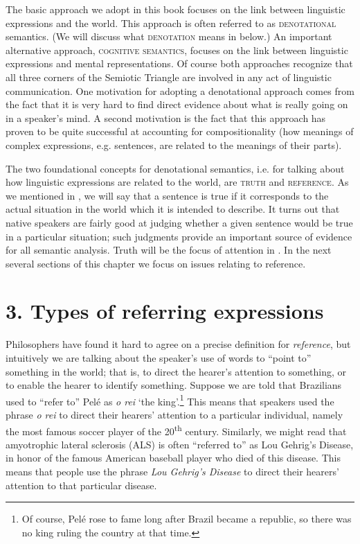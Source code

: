 The basic approach we adopt in this book focuses on the link between linguistic expressions and the world. This approach is often referred to as \textsc{denotational} semantics. (We will discuss what \textsc{denotation} means in  below.) An important alternative approach, \textsc{cognitive semantics}, focuses on the link between linguistic expressions and mental representations. Of course both approaches recognize that all three corners of the Semiotic Triangle are involved in any act of linguistic communication. One motivation for adopting a denotational approach comes from the fact that it is very hard to find direct evidence about what is really going on in a speaker’s mind. A second motivation is the fact that this approach has proven to be quite successful at accounting for compositionality (how meanings of complex expressions, e.g. sentences, are related to the meanings of their parts).



The two foundational concepts for denotational semantics, i.e. for talking about how linguistic expressions are related to the world, are \textsc{truth} and \textsc{reference}. As we mentioned in , we will say that a sentence is true if it corresponds to the actual situation in the world which it is intended to describe. It turns out that native speakers are fairly good at judging whether a given sentence would be true in a particular situation; such judgments provide an important source of evidence for all semantic analysis. Truth will be the focus of attention in . In the next several sections of this chapter we focus on issues relating to reference.


\section{3. Types of referring expressions}\label{sec:}

Philosophers have found it hard to agree on a precise definition for \textit{reference}, but intuitively we are talking about the speaker’s use of words to “point to” something in the world; that is, to direct the hearer’s attention to something, or to enable the hearer to identify something. Suppose we are told that Brazilians used to “refer to” Pelé as \textit{o rei} ‘the king’.\footnote{Of course, Pelé rose to fame long after Brazil became a republic, so there was no king ruling the country at that time.} This means that speakers used the phrase \textit{o rei} to direct their hearers’ attention to a particular individual, namely the most famous soccer player of the 20\textsuperscript{th} century. Similarly, we might read that amyotrophic lateral sclerosis (ALS) is often “referred to” as Lou Gehrig’s Disease, in honor of the famous American baseball player who died of this disease. This means that people use the phrase \textit{Lou Gehrig’s Disease} to direct their hearers’ attention to that particular disease.



